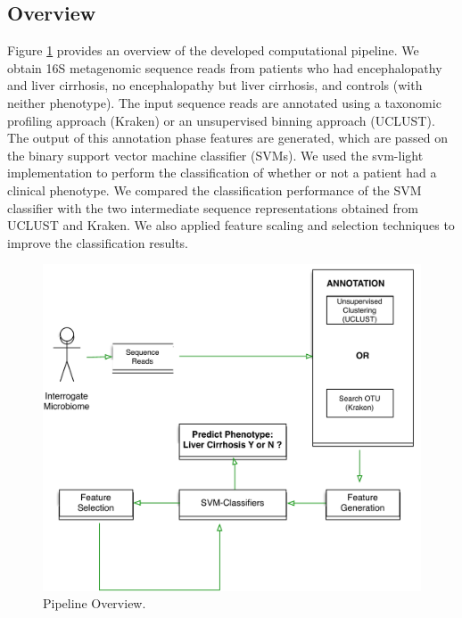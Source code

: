 
\subsection{Overview}

Figure \ref{fig1} provides an overview of the 
developed computational pipeline. 
%
We obtain 16S metagenomic sequence reads from patients who 
had encephalopathy and liver cirrhosis, no encephalopathy but liver cirrhosis, and controls (with neither phenotype). The input sequence 
reads are annotated using a taxonomic profiling approach (Kraken) or 
an unsupervised binning approach (UCLUST). The output of this annotation phase 
features are generated, which are passed on the binary support vector machine 
classifier (SVMs).  We used the  svm-light implementation \cite{Joachims08}  
to perform the classification of whether or not a patient 
had a clinical phenotype. We compared the classification performance of the 
SVM classifier with the two intermediate sequence representations obtained from 
UCLUST and Kraken. We also applied feature scaling and 
selection techniques to improve the classification results.

\begin{figure}[t]
\begin{center}
\caption{Pipeline Overview. \label{fig1}}
\includegraphics[scale=0.7]{./diagrams/concept}
\end{center}
\end{figure}

